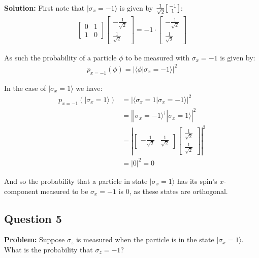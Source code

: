 \documentclass{article}
\newcommand{\icol}[1]{%
  \begin{bsmallmatrix}#1\end{bsmallmatrix}%
}
\begin{document}
\noindent\textbf{Solution:} First note that $|\sigma_x=-1\rangle$ is given by $\frac{1}{\sqrt{2}}\icol{-1\\1}$:
\begin{align*}
    \begin{bmatrix}
        0&1\\1&0
    \end{bmatrix}\begin{bmatrix}
        -\frac{1}{\sqrt{2}}\\\frac{1}{\sqrt{2}}
    \end{bmatrix}=-1\cdot\begin{bmatrix}
        -\frac{1}{\sqrt{2}}\\\frac{1}{\sqrt{2}}
    \end{bmatrix}
\end{align*} 

As such the probability of a particle $\phi$ to be measured with $\sigma_x=-1$ is given by:
\begin{align*}
    p_{x=-1}(\phi)=\left|\langle\phi|\sigma_x=-1\rangle\right|^2
\end{align*}

In the case of $|\sigma_x=1\rangle$ we have:
\begin{align*}
    p_{x=-1}(|\sigma_x=1\rangle)&=\left|\langle\sigma_x=1|\sigma_x=-1\rangle\right|^2\\
    &=\left||\sigma_x=-1\rangle^\dagger|\sigma_x=1\rangle\right|^2\\
    &=\left|\begin{bmatrix}
        -\frac{1}{\sqrt{2}}&\frac{1}{\sqrt{2}}
    \end{bmatrix}\begin{bmatrix}
        \frac{1}{\sqrt{2}}\\\frac{1}{\sqrt{2}}
    \end{bmatrix}\right|^2\\
    &=|0|^2=0
\end{align*}

And so the probability that a particle in state $|\sigma_x=1\rangle$ has its spin's $x$-component measured to be $\sigma_x=-1$ is 0, as these states are orthogonal.

\subsection*{Question 5}
\noindent\textbf{Problem:} Suppose $\sigma_z$ is measured when the particle is in the state $|\sigma_x=1\rangle$. What is the probability that $\sigma_z=-1$?
\bigskip
\end{document}
